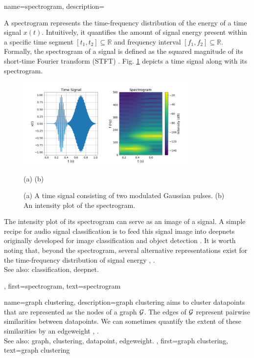 {name={spectrogram},
	description={A spectrogram represents the time-frequency distribution of the energy of a time signal $x(t)$.  
		Intuitively, it quantifies the amount of signal energy present within a specific time segment 
		$[t_{1},t_{2}] \subseteq \mathbb{R}$ and frequency interval $[f_{1},f_{2}]\subseteq \mathbb{R}$. 
		Formally, the spectrogram of a signal is defined as the squared magnitude of its 
		short-time Fourier transform (STFT) \cite{cohen1995time}.
        		Fig. \ref{fig:spectrogram_dict} depicts a time signal along with its spectrogram. 
		\begin{figure}[H]
			\centering
			\includegraphics[width=0.8\textwidth]{assets/spectrogram.png}
			\begin{minipage}{\textwidth}
				\vspace{3ex}
				\centering
				{\selectfont (a) \hspace{10em} (b)}
			\end{minipage}
			\caption{(a) A time signal consisting of two modulated Gaussian pulses. (b) An intensity 
			plot of the spectrogram.
			\label{fig:spectrogram_dict}}
		\end{figure}
        		The intensity plot of its spectrogram can serve as an image of a signal. A 
		simple recipe for audio signal \gls{classification} is to feed this signal image 
		into \glspl{deepnet} originally developed for image \gls{classification} and object detection \cite{Li:2022aa}. 
		It is worth noting that, beyond the spectrogram, several alternative representations exist 
		for the time-frequency distribution of signal energy \cite{TimeFrequencyAnalysisBoashash}, \cite{MallatBook}.
					\\ 
		See also: \gls{classification}, \gls{deepnet}.}, 
	first={spectrogram},
	text={spectrogram} 
}

{name={graph clustering},
	description={\Gls{graph} \gls{clustering} aims to 
		cluster \glspl{datapoint} that are represented as the nodes 
		of a \gls{graph} $\mathcal{G}$. The edges of $\mathcal{G}$ represent 
		pairwise similarities between \glspl{datapoint}. We can sometimes
		quantify the extent of these similarities by an \gls{edgeweight} \cite{FlowSpecClustering2021}, \cite{Luxburg2007}.
					\\ 
		See also: \gls{graph}, \gls{clustering}, \gls{datapoint}, \gls{edgeweight}. }, 
	first={graph clustering},
	text={graph clustering} 
}

